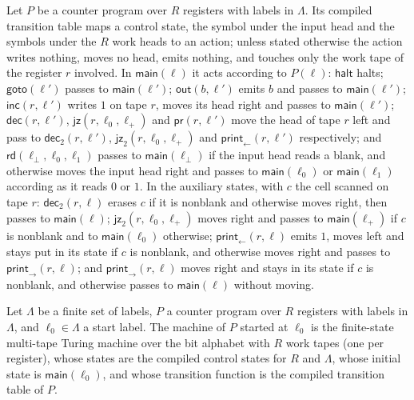 \begin{definition}
\label{Complexity.CounterProg.tr}
\leanok
{}
Let $P$ be a counter program over $R$ registers with labels in $\Lambda$. Its compiled transition
table maps a control state, the symbol under the input head and the symbols under the $R$ work
heads to an action; unless stated otherwise the action writes nothing, moves no head, emits
nothing, and touches only the work tape of the register $r$ involved. In $\mathsf{main}(\ell)$
it acts according to $P(\ell)$: $\mathsf{halt}$ halts; $\mathsf{goto}(\ell')$ passes to
$\mathsf{main}(\ell')$; $\mathsf{out}(b, \ell')$ emits $b$ and passes to $\mathsf{main}(\ell')$;
$\mathsf{inc}(r, \ell')$ writes $1$ on tape $r$, moves its head right and passes to
$\mathsf{main}(\ell')$; $\mathsf{dec}(r, \ell')$, $\mathsf{jz}(r, \ell_0, \ell_+)$ and
$\mathsf{pr}(r, \ell')$ move the head of tape $r$ left and pass to $\mathsf{dec}_2(r, \ell')$,
$\mathsf{jz}_2(r, \ell_0, \ell_+)$ and $\mathsf{print}_{\leftarrow}(r, \ell')$ respectively; and
$\mathsf{rd}(\ell_\bot, \ell_0, \ell_1)$ passes to $\mathsf{main}(\ell_\bot)$ if the input head
reads a blank, and otherwise moves the input head right and passes to $\mathsf{main}(\ell_0)$ or
$\mathsf{main}(\ell_1)$ according as it reads $0$ or $1$. In the auxiliary states, with $c$ the
cell scanned on tape $r$: $\mathsf{dec}_2(r, \ell)$ erases $c$ if it is nonblank and otherwise
moves right, then passes to $\mathsf{main}(\ell)$; $\mathsf{jz}_2(r, \ell_0, \ell_+)$ moves right
and passes to $\mathsf{main}(\ell_+)$ if $c$ is nonblank and to $\mathsf{main}(\ell_0)$
otherwise; $\mathsf{print}_{\leftarrow}(r, \ell)$ emits $1$, moves left and stays put in its
state if $c$ is nonblank, and otherwise moves right and passes to
$\mathsf{print}_{\rightarrow}(r, \ell)$; and $\mathsf{print}_{\rightarrow}(r, \ell)$ moves right
and stays in its state if $c$ is nonblank, and otherwise passes to $\mathsf{main}(\ell)$ without
moving.
\end{definition}

\begin{definition}
\label{Complexity.CounterProg.toTM}
\leanok
{}
Let $\Lambda$ be a finite set of labels, $P$ a counter program over $R$ registers with labels in
$\Lambda$, and $\ell_0 \in \Lambda$ a start label. The machine of $P$ started at $\ell_0$ is the
finite-state multi-tape Turing machine over the bit alphabet with $R$ work tapes (one per
register), whose states are the compiled control states for $R$ and $\Lambda$, whose initial
state is $\mathsf{main}(\ell_0)$, and whose transition function is the compiled transition table
of $P$.
\end{definition}

